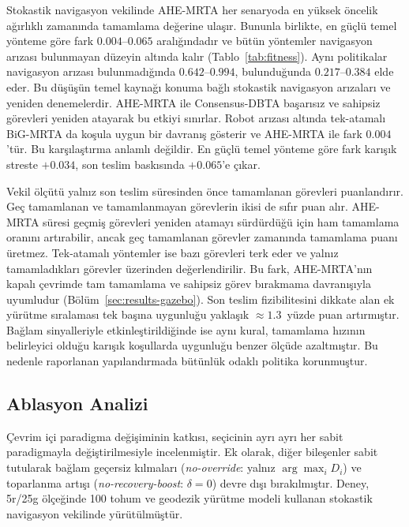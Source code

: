 \documentclass[10pt,letterpaper,onecolumn]{IEEEtran}
\begin{document}
\label{sec:deadline-tie}
Stokastik navigasyon vekilinde AHE-MRTA her senaryoda en yüksek öncelik
ağırlıklı zamanında tamamlama değerine ulaşır. Bununla birlikte, en güçlü
temel yönteme göre fark $0.004$--$0.065$ aralığındadır ve bütün yöntemler
navigasyon arızası bulunmayan düzeyin altında kalır
(Tablo~\ref{tab:fitness}). Aynı politikalar navigasyon arızası bulunmadığında
$0.642$--$0.994$, bulunduğunda $0.217$--$0.384$ elde eder. Bu düşüşün temel
kaynağı konuma bağlı stokastik navigasyon arızaları ve yeniden denemelerdir.
AHE-MRTA ile Consensus-DBTA başarısız ve sahipsiz görevleri yeniden atayarak
bu etkiyi sınırlar. Robot arızası altında tek-atamalı BiG-MRTA da koşula uygun
bir davranış gösterir ve AHE-MRTA ile fark $0.004$'tür. Bu karşılaştırma
anlamlı değildir. En güçlü temel yönteme göre fark karışık streste $+0.034$,
son teslim baskısında $+0.065$'e çıkar.

Vekil ölçütü yalnız son teslim süresinden önce tamamlanan görevleri
puanlandırır. Geç tamamlanan ve tamamlanmayan görevlerin ikisi de sıfır puan
alır. AHE-MRTA süresi geçmiş görevleri yeniden atamayı sürdürdüğü için ham
tamamlama oranını artırabilir, ancak geç tamamlanan görevler zamanında
tamamlama puanı üretmez. Tek-atamalı yöntemler ise bazı görevleri terk eder ve
yalnız tamamladıkları görevler üzerinden değerlendirilir. Bu fark, AHE-MRTA'nın
kapalı çevrimde tam tamamlama ve sahipsiz görev bırakmama davranışıyla
uyumludur (Bölüm~\ref{sec:results-gazebo}). Son teslim fizibilitesini dikkate
alan ek yürütme sıralaması tek başına uygunluğu yaklaşık ${\approx}1.3$~yüzde
puan artırmıştır. Bağlam sinyalleriyle etkinleştirildiğinde ise aynı kural,
tamamlama hızının belirleyici olduğu karışık koşullarda uygunluğu benzer
ölçüde azaltmıştır. Bu nedenle raporlanan yapılandırmada bütünlük odaklı
politika korunmuştur.

\subsection{Ablasyon Analizi}
\label{sec:ablation}
Çevrim içi paradigma değişiminin katkısı, seçicinin ayrı ayrı her sabit
paradigmayla değiştirilmesiyle incelenmiştir. Ek olarak, diğer bileşenler sabit
tutularak bağlam geçersiz kılmaları (\emph{no-override}: yalnız
$\arg\max_i D_i$) ve toparlanma artışı
(\emph{no-recovery-boost}: $\delta{=}0$) devre dışı bırakılmıştır. Deney,
5r/25g ölçeğinde 100 tohum ve geodezik yürütme modeli kullanan stokastik
navigasyon vekilinde yürütülmüştür.


\end{document}
